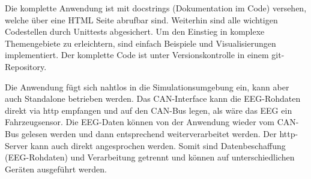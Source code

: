 Die komplette Anwendung ist mit docstrings (Dokumentation im Code) versehen, welche über eine HTML Seite abrufbar sind. Weiterhin sind alle wichtigen Codestellen durch Unittests abgesichert. Um den Einstieg in komplexe Themengebiete zu erleichtern, sind einfach Beispiele und Visualisierungen implementiert. Der komplette Code ist unter Versionskontrolle in einem git-Repository.

Die Anwendung fügt sich nahtlos in die Simulationsumgebung ein, kann aber auch Standalone betrieben werden. Das CAN-Interface kann die EEG-Rohdaten direkt via http empfangen und auf den CAN-Bus legen, als wäre das EEG ein Fahrzeugsensor. Die EEG-Daten können von der Anwendung wieder vom CAN-Bus gelesen werden und dann entsprechend weiterverarbeitet werden. Der http-Server kann auch direkt angesprochen werden. Somit sind Datenbeschaffung (EEG-Rohdaten) und Verarbeitung getrennt und können auf unterschiedlichen Geräten ausgeführt werden.